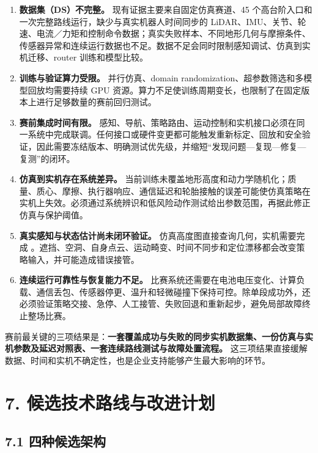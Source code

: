 \documentclass[
  11pt,
  a4paper,
]{article}
\providecommand{\tightlist}{%
  \setlength{\itemsep}{0pt}\setlength{\parskip}{0pt}}
\begin{document}
\begin{enumerate}
\def\labelenumi{\arabic{enumi}.}
\tightlist
\item
  \textbf{数据集（DS）不完整。} 现有证据主要来自固定仿真赛道、45
  个高台阶入口和一次完整路线运行，缺少与真实机器人时间同步的
  LiDAR、IMU、关节、轮速、电流／力矩和控制命令数据；真实失败样本、不同地形几何与摩擦条件、传感器异常和连续运行数据也不足。数据不足会同时限制感知调试、仿真到实机迁移、router
  训练和模型比较。
\item
  \textbf{训练与验证算力受限。} 并行仿真、domain
  randomization、超参数筛选和多模型回放均需要持续 GPU
  资源。算力不足使训练周期变长，也限制了在固定版本上进行足够数量的赛前回归测试。
\item
  \textbf{赛前集成时间有限。}
  感知、导航、策略路由、运动控制和实机接口必须在同一系统中完成联调。任何接口或硬件变更都可能触发重新标定、回放和安全验证，因此需要冻结版本、明确测试优先级，并缩短``发现问题---复现---修复---复测''的闭环。
\item
  \textbf{仿真到实机存在系统差异。}
  当前训练未覆盖地形高度和动力学随机化；质量、质心、摩擦、执行器响应、通信延迟和轮胎接触的误差可能使仿真策略在实机上失效。必须通过系统辨识和低风险动作测试给出参数范围，再据此修正仿真与保护阈值。
\item
  \textbf{真实感知与状态估计尚未闭环验证。}
  仿真高度图直接查询几何，实机需要完成
  {\ttfamily\fontsize{8.3}{10.5}\selectfont{}}。遮挡、空洞、自身点云、运动畸变、时间不同步和定位漂移都会改变策略输入，并可能造成错误接管。
\item
  \textbf{连续运行可靠性与恢复能力不足。}
  比赛系统还需要在电池电压变化、计算负载、通信丢包、传感器停更、温升和轻微碰撞下保持可控。除单段成功外，还必须验证策略交接、急停、人工接管、失败回退和重新起步，避免局部故障终止整场比赛。
\end{enumerate}

赛前最关键的三项结果是：\textbf{一套覆盖成功与失败的同步实机数据集、一份仿真与实机参数及延迟对照表、一套连续路线测试与故障处置流程。}
这三项结果直接缓解数据、时间和实机不确定性，也是企业支持能够产生最大影响的环节。

\clearpage

\section{7.
候选技术路线与改进计划}\label{ux5019ux9009ux6280ux672fux8defux7ebfux4e0eux6539ux8fdbux8ba1ux5212}

\subsection{7.1
四种候选架构}\label{ux56dbux79cdux5019ux9009ux67b6ux6784}
\end{document}
